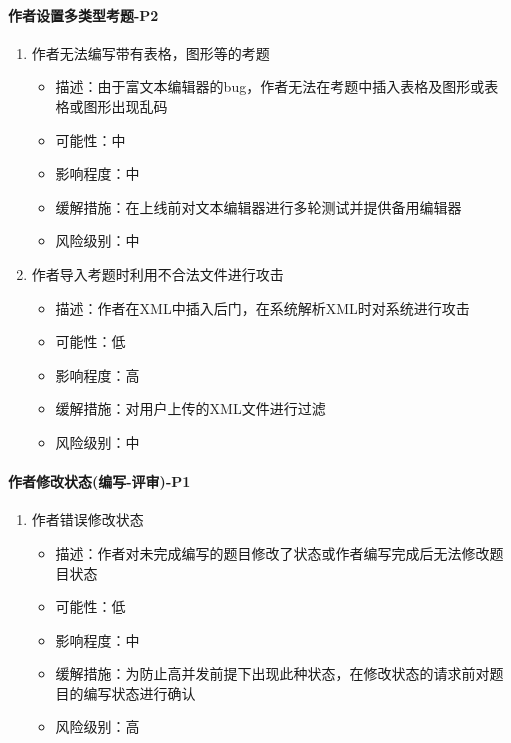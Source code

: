 \documentclass[hyperref, a4paper]{ctexart}
\providecommand{\tightlist}{%
  \setlength{\itemsep}{0pt}\setlength{\parskip}{0pt}}
\let\oldparagraph\paragraph
\renewcommand{\paragraph}[1]{\oldparagraph{#1}\mbox{}}
\begin{document}
\hypertarget{ux4f5cux8005ux8bbeux7f6eux591aux7c7bux578bux8003ux9898-p2}{%
\paragraph{作者设置多类型考题-P2}\label{ux4f5cux8005ux8bbeux7f6eux591aux7c7bux578bux8003ux9898-p2}}

\begin{enumerate}
\def\labelenumi{\arabic{enumi}.}
\tightlist
\item
  作者无法编写带有表格，图形等的考题

  \begin{itemize}
  \tightlist
  \item
    描述：由于富文本编辑器的bug，作者无法在考题中插入表格及图形或表格或图形出现乱码
  \item
    可能性：中
  \item
    影响程度：中
  \item
    缓解措施：在上线前对文本编辑器进行多轮测试并提供备用编辑器
  \item
    风险级别：中
  \end{itemize}
\item
  作者导入考题时利用不合法文件进行攻击

  \begin{itemize}
  \tightlist
  \item
    描述：作者在XML中插入后门，在系统解析XML时对系统进行攻击
  \item
    可能性：低
  \item
    影响程度：高
  \item
    缓解措施：对用户上传的XML文件进行过滤
  \item
    风险级别：中
  \end{itemize}
\end{enumerate}

\hypertarget{ux4f5cux8005ux4feeux6539ux72b6ux6001ux7f16ux5199-ux8bc4ux5ba1-p1}{%
\paragraph{作者修改状态(编写-评审)-P1}\label{ux4f5cux8005ux4feeux6539ux72b6ux6001ux7f16ux5199-ux8bc4ux5ba1-p1}}

\begin{enumerate}
\def\labelenumi{\arabic{enumi}.}
\tightlist
\item
  作者错误修改状态

  \begin{itemize}
  \tightlist
  \item
    描述：作者对未完成编写的题目修改了状态或作者编写完成后无法修改题目状态
  \item
    可能性：低
  \item
    影响程度：中
  \item
    缓解措施：为防止高并发前提下出现此种状态，在修改状态的请求前对题目的编写状态进行确认
  \item
    风险级别：高
  \end{itemize}
\end{enumerate}
\end{document}
